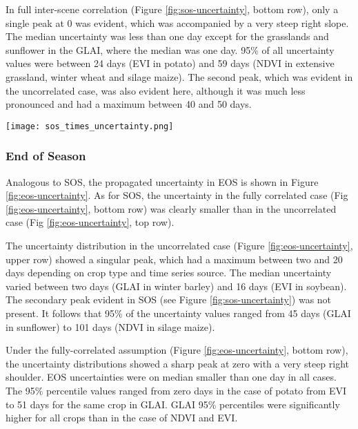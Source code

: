 In full inter-scene correlation (Figure \ref{fig:sos-uncertainty}, bottom row), only a single peak at 0 was evident, which was accompanied by a very steep right slope. The median uncertainty was less than one day except for the grasslands and sunflower in the GLAI, where the median was one day. 95\% of all uncertainty values were between 24 days (\gls{EVI}  in potato) and 59 days (\gls{NDVI}  in extensive grassland, winter wheat and silage maize). The second peak, which was evident in the uncorrelated case, was also evident here, although it was much less pronounced and had a maximum between 40 and 50 days.

\begin{figure*}
    \centering
    \texttt{[image: sos\_times\_uncertainty.png]}
    \caption{Kernel-based relative uncertainty distributions in Start of Season (SOS) for \gls{EVI} (left column), \gls{NDVI} (middle column), and \gls{GLAI} (right column) color-coded by crop-type. The top row shows the results of the  \gls{MC} runs with zero inter-scene correlation; the bottom row the results assuming full inter-scene correlation.}
    \label{fig:sos-uncertainty}
\end{figure*}

\subsubsection{End of Season}

Analogous to SOS, the propagated uncertainty in \gls{EOS} is shown in Figure \ref{fig:eos-uncertainty}. As for SOS, the uncertainty in the fully correlated case (Fig \ref{fig:eos-uncertainty}, bottom row) was clearly smaller than in the uncorrelated case (Fig \ref{fig:eos-uncertainty}, top row).

The uncertainty distribution in the uncorrelated case (Figure \ref{fig:eos-uncertainty}, upper row) showed a singular peak, which had a maximum between two and 20 days depending on crop type and time series source. The median uncertainty varied between two days (\gls{GLAI} in winter barley) and 16 days (\gls{EVI}  in soybean). The secondary peak evident in \gls{SOS} (see Figure \ref{fig:sos-uncertainty}) was not present. It follows that 95\% of the uncertainty values ranged from 45 days (\gls{GLAI} in sunflower) to 101 days (\gls{NDVI}  in silage maize).

Under the fully-correlated assumption (Figure \ref{fig:eos-uncertainty}, bottom row), the uncertainty distributions showed a sharp peak at zero with a very steep right shoulder. \gls{EOS} uncertainties were on median smaller than one day in all cases. The 95\% percentile values ranged from zero days in the case of potato from \gls{EVI} to 51 days for the same crop in GLAI. \gls{GLAI} 95\% percentiles were significantly higher for all crops than in the case of \gls{NDVI} and EVI.


